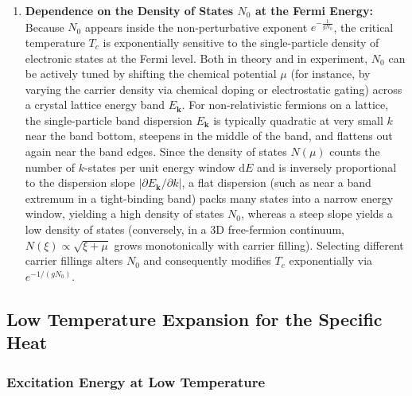 \begin{enumerate}
    \item \textbf{Dependence on the Density of States \( N_0 \) at the Fermi Energy:} Because \( N_0 \) appears inside the non-perturbative exponent \( e^{-\frac{1}{gN_0}} \), the critical temperature \( T_c \) is exponentially sensitive to the single-particle density of electronic states at the Fermi level. Both in theory and in experiment, \( N_0 \) can be actively tuned by shifting the chemical potential \( \mu \) (for instance, by varying the carrier density via chemical doping or electrostatic gating) across a crystal lattice energy band \( E_{\mathbf{k}} \). For non-relativistic fermions on a lattice, the single-particle band dispersion \( E_{\mathbf{k}} \) is typically quadratic at very small \( k \) near the band bottom, steepens in the middle of the band, and flattens out again near the band edges. Since the density of states \( N(\mu) \) counts the number of \( k \)-states per unit energy window \( \mathrm{d}E \) and is inversely proportional to the dispersion slope \( |\partial E_{\mathbf{k}} / \partial k| \), a flat dispersion (such as near a band extremum in a tight-binding band) packs many states into a narrow energy window, yielding a high density of states \( N_0 \), whereas a steep slope yields a low density of states (conversely, in a 3D free-fermion continuum, \( N(\xi) \propto \sqrt{\xi + \mu} \) grows monotonically with carrier filling). Selecting different carrier fillings alters \( N_0 \) and consequently modifies \( T_c \) exponentially via \( e^{-1/(gN_0)} \).
\end{enumerate}


\subsection{Low Temperature Expansion for the Specific Heat}

\subsubsection{Excitation Energy at Low Temperature}

